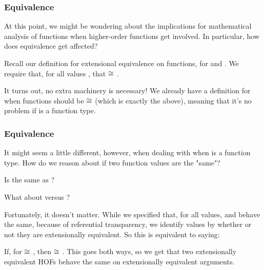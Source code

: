 \documentclass[aspectratio=169, handout]{beamer}
\begin{document}

\begin{frame}[fragile]
  \frametitle{Equivalence}

  At this point, we might be wondering about the implications for mathematical
  analysis of functions when higher-order functions get involved. In particular,
  how does equivalence get affected?

  \pause
  \vspace{\fill}

  Recall our definition for extensional equivalence on functions, for 
  and . We require that, for all values , that
   $\cong$ .

  \pause
  \vspace{\fill}

  It turns out, no extra machinery is necessary! We already have a definition for
  when functions should be $\cong$ (which is exactly the above), meaning that it's
  no problem if  is a function type.
\end{frame}

\begin{frame}[fragile]
  \frametitle{Equivalence}

  It might seem a little different, however, when dealing with when  is
  a function type. How do we reason about if two function values are the "same"?

  \pause
  \vspace{\fill}

  Is  the same as ?

  \pause
  \vspace{\fill}

  What about  versus ?

  \pause
  \vspace{\fill}

  Fortunately, it doesn't matter. While we specified that, for all values, 
  and  behave the same, because of referential transparency, we identify values
  by whether or not they are extensionally equivalent. So this is equivalent to saying:

  \pause
  \vspace{\fill}

  If, for  $\cong$ , then  $\cong$ . This goes
  both ways, so we get that two extensionally equivalent HOFs behave the same on
  extensionally equivalent arguments.
\end{frame}
\end{document}
